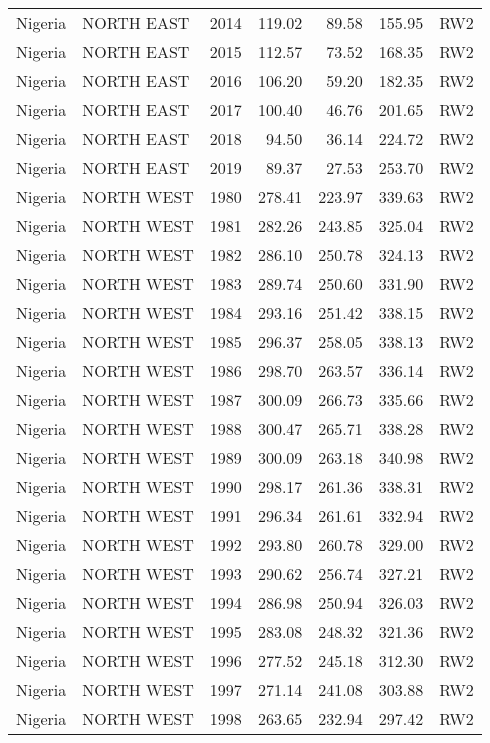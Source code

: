 \begin{longtable}{lllrrrl}
  Nigeria & NORTH EAST & 2014 & 119.02 & 89.58 & 155.95 & RW2 \\ 
  Nigeria & NORTH EAST & 2015 & 112.57 & 73.52 & 168.35 & RW2 \\ 
  Nigeria & NORTH EAST & 2016 & 106.20 & 59.20 & 182.35 & RW2 \\ 
  Nigeria & NORTH EAST & 2017 & 100.40 & 46.76 & 201.65 & RW2 \\ 
  Nigeria & NORTH EAST & 2018 & 94.50 & 36.14 & 224.72 & RW2 \\ 
  Nigeria & NORTH EAST & 2019 & 89.37 & 27.53 & 253.70 & RW2 \\ 
  Nigeria & NORTH WEST & 1980 & 278.41 & 223.97 & 339.63 & RW2 \\ 
  Nigeria & NORTH WEST & 1981 & 282.26 & 243.85 & 325.04 & RW2 \\ 
  Nigeria & NORTH WEST & 1982 & 286.10 & 250.78 & 324.13 & RW2 \\ 
  Nigeria & NORTH WEST & 1983 & 289.74 & 250.60 & 331.90 & RW2 \\ 
  Nigeria & NORTH WEST & 1984 & 293.16 & 251.42 & 338.15 & RW2 \\ 
  Nigeria & NORTH WEST & 1985 & 296.37 & 258.05 & 338.13 & RW2 \\ 
  Nigeria & NORTH WEST & 1986 & 298.70 & 263.57 & 336.14 & RW2 \\ 
  Nigeria & NORTH WEST & 1987 & 300.09 & 266.73 & 335.66 & RW2 \\ 
  Nigeria & NORTH WEST & 1988 & 300.47 & 265.71 & 338.28 & RW2 \\ 
  Nigeria & NORTH WEST & 1989 & 300.09 & 263.18 & 340.98 & RW2 \\ 
  Nigeria & NORTH WEST & 1990 & 298.17 & 261.36 & 338.31 & RW2 \\ 
  Nigeria & NORTH WEST & 1991 & 296.34 & 261.61 & 332.94 & RW2 \\ 
  Nigeria & NORTH WEST & 1992 & 293.80 & 260.78 & 329.00 & RW2 \\ 
  Nigeria & NORTH WEST & 1993 & 290.62 & 256.74 & 327.21 & RW2 \\ 
  Nigeria & NORTH WEST & 1994 & 286.98 & 250.94 & 326.03 & RW2 \\ 
  Nigeria & NORTH WEST & 1995 & 283.08 & 248.32 & 321.36 & RW2 \\ 
  Nigeria & NORTH WEST & 1996 & 277.52 & 245.18 & 312.30 & RW2 \\ 
  Nigeria & NORTH WEST & 1997 & 271.14 & 241.08 & 303.88 & RW2 \\ 
  Nigeria & NORTH WEST & 1998 & 263.65 & 232.94 & 297.42 & RW2 \\ 

\end{longtable}
